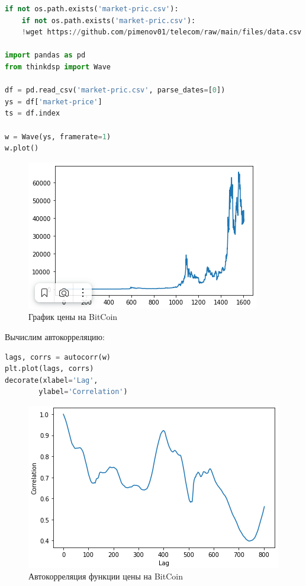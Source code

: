 \begin{lstlisting}[language=Python]
if not os.path.exists('market-pric.csv'):
    if not os.path.exists('market-pric.csv'):
    !wget https://github.com/pimenov01/telecom/raw/main/files/data.csv

import pandas as pd
from thinkdsp import Wave

df = pd.read_csv('market-pric.csv', parse_dates=[0])
ys = df['market-price']
ts = df.index

w = Wave(ys, framerate=1)
w.plot()

\end{lstlisting}
\begin{figure}[H]
	\begin{center}
		\includegraphics[scale=1]{fig/lab05/lab5_5.png}
		\caption{График цены на BitCoin}
	\end{center}
\end{figure}

Вычислим автокорреляцию:

\begin{lstlisting}[language=Python]
lags, corrs = autocorr(w)
plt.plot(lags, corrs)
decorate(xlabel='Lag',
        ylabel='Correlation')
\end{lstlisting}
\begin{figure}[H]
	\begin{center}
		\includegraphics[scale=1]{fig/lab05/lab5_6.png}
		\caption{Автокорреляция функции цены на BitCoin}
	\end{center}
\end{figure}

